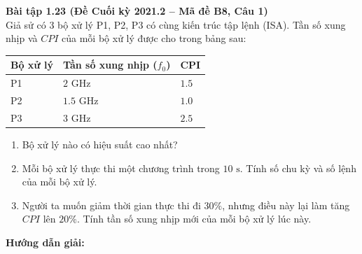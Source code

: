 \textbf{Bài tập 1.23 (Đề Cuối kỳ 2021.2 -- Mã đề B8, Câu 1)}\\
Giả sử có 3 bộ xử lý P1, P2, P3 có cùng kiến trúc tập lệnh (ISA). Tần số xung nhịp và $CPI$ của mỗi bộ xử lý được cho trong bảng sau:
\begin{center}
\begin{tabularx}{0.65\textwidth}{|C{2.5cm}|Z|Z|}
\hline
\textbf{Bộ xử lý} & \textbf{Tần số xung nhịp ($f_0$)} & \textbf{CPI} \\ \hline
P1 & $2\text{ GHz}$ & $1.5$ \\ \hline
P2 & $1.5\text{ GHz}$ & $1.0$ \\ \hline
P3 & $3\text{ GHz}$ & $2.5$ \\ \hline
\end{tabularx}
\end{center}
\begin{enumerate}[label=1.\arabic*.]
    \item Bộ xử lý nào có hiệu suất cao nhất?
    \item Mỗi bộ xử lý thực thi một chương trình trong $10\text{ s}$. Tính số chu kỳ và số lệnh của mỗi bộ xử lý.
    \item Người ta muốn giảm thời gian thực thi đi $30\%$, nhưng điều này lại làm tăng $CPI$ lên $20\%$. Tính tần số xung nhịp mới của mỗi bộ xử lý lúc này.
\end{enumerate}
\textbf{Hướng dẫn giải:}
